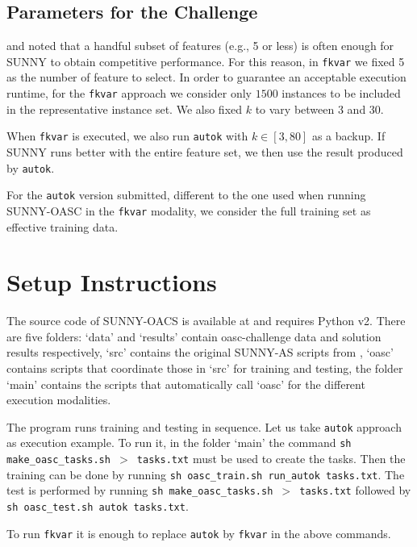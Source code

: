 \documentclass[tablecaption=bottom,wcp]{jmlr} %
\begin{document}
\subsection{Parameters for the Challenge}
\cite{bischl2016aslib} and \cite{ictai_paper} noted that a handful 
subset 
of features (e.g., 5 or less) is often enough for SUNNY to obtain  
competitive performance. For this reason, in \texttt{fkvar} we fixed 
5 as the number of feature to select. In order to guarantee an acceptable 
execution runtime, for the \texttt{fkvar} approach we 
consider only $1500$ instances to be included in the 
representative instance set. We also fixed $k$ to vary between 3 and 30. 

When \texttt{fkvar} is executed, we also run 
\texttt{autok} with $k \in [3,80]$ as a backup. If SUNNY runs better with the 
entire feature set, we then use the result produced by \texttt{autok}.

For the \texttt{autok} version submitted, different to the one used when 
running SUNNY-OASC in the \texttt{fkvar} modality, we consider the 
full training set as effective training data. 

\section{Setup Instructions}

The source code of SUNNY-OACS is available at \cite{sunnyoasc} and requires 
Python v2. There are five folders: `data' and `results' contain oasc-challenge 
data and solution results respectively, `src' contains the original SUNNY-AS 
scripts from \cite{sunnyas}, `oasc' contains scripts that coordinate those in 
`src' for training and testing, the folder `main' contains the scripts that 
automatically call `oasc' for the different execution modalities. 

The program runs training and testing in sequence. Let us take \texttt{autok} 
approach as execution example. To run it, in the folder `main' the 
command \texttt{sh make\_oasc\_tasks.sh $>$ tasks.txt} must be used to create 
the tasks. Then the training can be done by running \texttt{sh oasc\_train.sh 
run\_autok tasks.txt}. The test is performed by running \texttt{sh 
make\_oasc\_tasks.sh $>$ tasks.txt} followed by \texttt{sh oasc\_test.sh autok 
tasks.txt}.

To run \texttt{fkvar} it is enough to replace 
 \texttt{autok} by \texttt{fkvar} in the above commands. 



\end{document}
